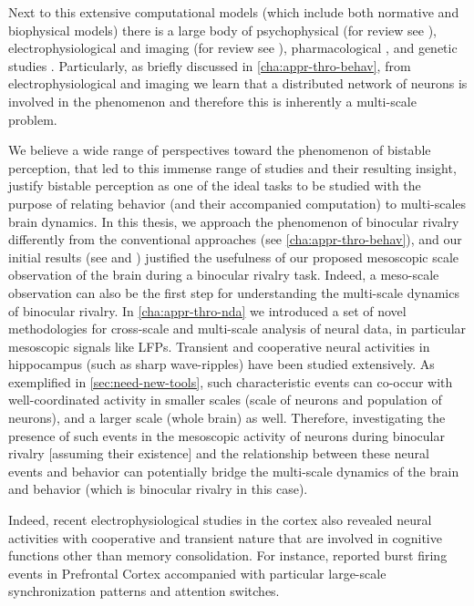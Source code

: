 Next to this extensive computational models
(which include both normative and biophysical models)
there is a large body of psychophysical (for review see \cite{klinkUnitedWeSense2012b}), electrophysiological and imaging
(for review see \cite{blakeVisualCompetition2002a,panagiotaropoulosSubjectiveVisualPerception2014a}), pharmacological \cite{carterPsilocybinSlowsBinocular,mentchGABAergicInhibitionGates2019}, and genetic studies \cite{millerGeneticContributionIndividual2010,ngoPsychiatricGeneticStudies2011a,lawEffectStimulusStrength2017,chenGenomicAnalysesVisual2018}.
Particularly, as briefly discussed in \autoref{cha:appr-thro-behav}, from electrophysiological and imaging we learn that a distributed network of neurons is involved in the phenomenon and therefore this is inherently a multi-scale problem.

We believe a wide range of perspectives toward the phenomenon of bistable perception,
that led to this immense range of studies and their resulting insight,  
justify bistable perception as one of the ideal tasks to be studied with the purpose of relating behavior (and their accompanied computation) to multi-scales brain dynamics.
In this thesis, we approach the phenomenon of binocular rivalry differently from the conventional approaches (see \autoref{cha:appr-thro-behav}),
and our initial results (see  and ) justified the usefulness of our proposed mesoscopic scale observation of the brain during a binocular rivalry task.
Indeed, a meso-scale observation can also be the first step for understanding the multi-scale dynamics of binocular rivalry.
In \autoref{cha:appr-thro-nda} we introduced a set of novel methodologies for cross-scale and multi-scale analysis of neural data, in particular mesoscopic signals like LFPs.
Transient and cooperative neural activities in hippocampus (such as sharp wave-ripples) have been studied extensively.
As exemplified in \autoref{sec:need-new-tools}, such characteristic events
can co-occur with well-coordinated activity in smaller scales (scale of neurons and population of neurons),
and a larger scale (whole brain) as well.
Therefore, investigating the presence of such events in the mesoscopic activity of neurons during binocular rivalry [assuming their existence] and
the relationship between these neural events and behavior can potentially bridge the multi-scale dynamics of the brain and behavior (which is binocular rivalry in this case). 

Indeed, recent electrophysiological studies in the cortex also revealed neural activities with cooperative and transient nature that are involved in cognitive functions other than memory consolidation. 
For instance, \citet{womelsdorfBurstFiringSynchronizes2014} reported burst firing events in Prefrontal Cortex accompanied with particular large-scale synchronization patterns and attention switches.

